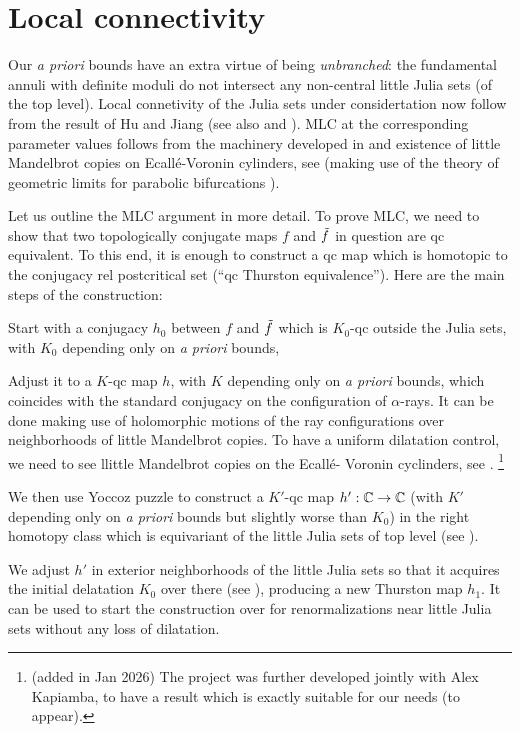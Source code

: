 
\section{Local connectivity}

Our {\em a priori} bounds have an extra virtue of being {\em unbranched}:
the fundamental annuli with definite moduli do not intersect any non-central little
Julia sets (of the top level). 
Local connetivity of the Julia sets under considertation now follow from the
result of Hu and Jiang \cite{HJ,J}
(see also \cite{McM} and \cite[\S 9.2] {puzzle}).
MLC at the corresponding parameter values follows from the machinery developed in
\cite{puzzle} and existence of little Mandelbrot copies on
Ecall\'e-Voronin cylinders, see \cite{C,DLP}
(making use of the theory of geometric limits for parabolic bifurcations \cite{D,La}). 
%

Let us outline the MLC argument  in more detail.
To prove MLC, we need to show that two topologically conjugate maps $f$ and $\tilde f$
in question
are qc equivalent.  To this end, it is enough to construct a qc map
which is homotopic to the conjugacy rel postcritical set (``qc Thurston equivalence'').
Here are the main steps of the construction:

Start with a conjugacy $h_0$ between $f$ and $\tilde f$
which is $K_0$-qc outside the Julia sets,
 with $K_0$ depending only on {\em a priori} bounds,
 
Adjust it to a $K$-qc  map $h$, with $K$ depending only on
{\em a priori} bounds, which coincides with the standard conjugacy on the
configuration of $\alpha$-rays. It can be done making use of holomorphic motions
of the ray configurations over neighborhoods of little Mandelbrot copies.
To have a uniform dilatation control, we need to see llittle Mandelbrot copies
on the Ecall\'e- Voronin cyclinders, see \cite{C,DLP}.%
\footnote{ (added in Jan 2026) The project \cite{DLP} was further developed
jointly with Alex Kapiamba,
to have a result which is exactly suitable for our needs (to appear).}



 We then use Yoccoz puzzle to construct a $K'$-qc map
$h' : {\Bbb C}\rightarrow {\Bbb C}$ (with $K'$ depending only on {\em a priori } bounds but slightly worse than
$K_0$) in the right homotopy class which is equivariant of the little
Julia sets of top level
(see \cite[\S 11]{puzzle}).

 We adjust $h'$ in exterior neighborhoods of the little Julia sets so that it acquires the initial 
delatation $K_0$ over there  (see \cite[\S 7.5] {puzzle}), producing a new Thurston map $h_1$.
It can be used to start the construction over for renormalizations near little Julia sets
without any loss of dilatation. 